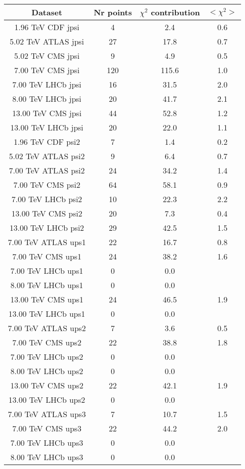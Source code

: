 \begin{table}[h!]
\centering
\begin{tabular}{c|c|c|c}
Dataset & Nr points & $\chi^2$ contribution & $<\chi^2>$ \\
\hline
1.96 TeV CDF jpsi & 4 & 2.4 & 0.6 \\
5.02 TeV ATLAS jpsi & 27 & 17.8 & 0.7 \\
5.02 TeV CMS jpsi & 9 & 4.9 & 0.5 \\
7.00 TeV CMS jpsi & 120 & 115.6 & 1.0 \\
7.00 TeV LHCb jpsi & 16 & 31.5 & 2.0 \\
8.00 TeV LHCb jpsi & 20 & 41.7 & 2.1 \\
13.00 TeV CMS jpsi & 44 & 52.8 & 1.2 \\
13.00 TeV LHCb jpsi & 20 & 22.0 & 1.1 \\
1.96 TeV CDF psi2 & 7 & 1.4 & 0.2 \\
5.02 TeV ATLAS psi2 & 9 & 6.4 & 0.7 \\
7.00 TeV ATLAS psi2 & 24 & 34.2 & 1.4 \\
7.00 TeV CMS psi2 & 64 & 58.1 & 0.9 \\
7.00 TeV LHCb psi2 & 10 & 22.3 & 2.2 \\
13.00 TeV CMS psi2 & 20 & 7.3 & 0.4 \\
13.00 TeV LHCb psi2 & 29 & 42.5 & 1.5 \\
7.00 TeV ATLAS ups1 & 22 & 16.7 & 0.8 \\
7.00 TeV CMS ups1 & 24 & 38.2 & 1.6 \\
7.00 TeV LHCb ups1 & 0 & 0.0 &  \\
8.00 TeV LHCb ups1 & 0 & 0.0 &  \\
13.00 TeV CMS ups1 & 24 & 46.5 & 1.9 \\
13.00 TeV LHCb ups1 & 0 & 0.0 &  \\
7.00 TeV ATLAS ups2 & 7 & 3.6 & 0.5 \\
7.00 TeV CMS ups2 & 22 & 38.8 & 1.8 \\
7.00 TeV LHCb ups2 & 0 & 0.0 &  \\
8.00 TeV LHCb ups2 & 0 & 0.0 &  \\
13.00 TeV CMS ups2 & 22 & 42.1 & 1.9 \\
13.00 TeV LHCb ups2 & 0 & 0.0 &  \\
7.00 TeV ATLAS ups3 & 7 & 10.7 & 1.5 \\
7.00 TeV CMS ups3 & 22 & 44.2 & 2.0 \\
7.00 TeV LHCb ups3 & 0 & 0.0 &  \\
8.00 TeV LHCb ups3 & 0 & 0.0 &  \\

\end{tabular}
\end{table}
